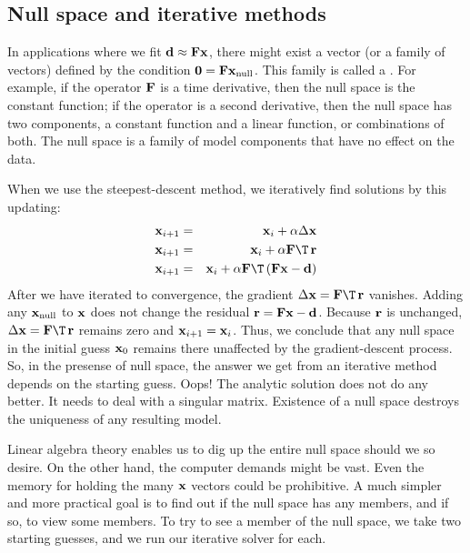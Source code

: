 \par

\subsection{Null space and iterative methods}
In applications where we fit
$\bold d \approx\bold F \bold x$,
there might exist a vector (or a family of vectors)
defined by the condition $\bold 0 =\bold F \bold x_{\rm null}$.
This family is called a .
For example, if the operator $\bold F$ is a time derivative,
then the null space is the constant function;
if the operator is a second derivative,
then the null space has two components, a constant function
and a linear function, or combinations of both.
The null space is a family of model components that have no effect on the data.
\par
When we use the steepest-descent method,
we iteratively find solutions by this updating:
\begin{eqnarray}
\bold x_{i+1} &=& \bold x_i + \alpha \Delta \bold x                     \\
\bold x_{i+1} &=& \bold x_i + \alpha \bold F\T\,\bold r                   \\
\bold x_{i+1} &=& \bold x_i + \alpha \bold F\T\,(\bold F\bold x -\bold d)
\end{eqnarray}
After we have iterated to convergence,
the gradient
$ \Delta \bold x=\bold F\T\, \bold r$
vanishes.
Adding any $\bold x_{\rm null}$ to $\bold x$
does not change the residual
$\bold r=\bold F\bold x -\bold d$.
Because $\bold r$ is unchanged,
$ \Delta \bold x=\bold F\T\, \bold r$
remains zero and $\bold x_{i+1} =\bold x_i$.
Thus, we conclude that any null space in the initial guess $\bold x_0$
remains there unaffected by the gradient-descent process.
So, in the presense of null space,
the answer we get from an iterative method
depends on the starting guess.
Oops!
The analytic solution does not do any better.
It needs to deal with a singular matrix.
Existence of a null space destroys the uniqueness of any resulting model.
\par
Linear algebra theory enables us to dig up the entire null space
should we so desire.
On the other hand, the computer demands might be vast.
Even the memory for holding the many $\bold x$ vectors could be prohibitive.
A much simpler and more practical goal
is to find out if the null space has any members,
and if so, to view some members.
To try to see a member of the null space,
we take two starting guesses,
and we run our iterative solver for each.
